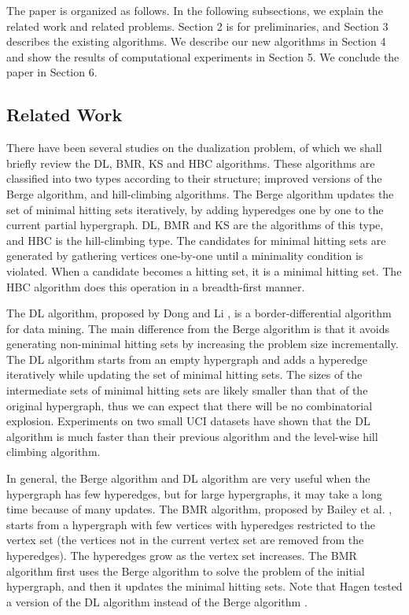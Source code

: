 The paper is organized as follows.
In the following subsections, we explain the related work and related problems.
Section 2 is for preliminaries, and Section 3 describes the existing
 algorithms.
We describe our new algorithms in Section 4 and show the results of
 computational experiments in Section 5.
We conclude the paper in Section 6.

\subsection{Related Work}

There have been several studies on the dualization problem, 
 of which we shall briefly review the DL, BMR, KS and HBC algorithms.
These algorithms are classified into two types according to their structure;
 improved versions of the Berge algorithm\cite{Ber89}, and hill-climbing
 algorithms.
The Berge algorithm updates the set of minimal hitting sets iteratively, 
 by adding hyperedges one by one to the current partial hypergraph.
DL, BMR and KS are the algorithms of this type, and HBC is the hill-climbing
 type.
The candidates for minimal hitting sets are generated by gathering
 vertices one-by-one until a minimality condition is violated.
When a candidate becomes a hitting set, it is a minimal hitting set.
The HBC algorithm does this operation in a breadth-first manner.
 
The DL algorithm, proposed by Dong and Li \cite{DgLj05},
 is a border-differential algorithm for data mining.
The main difference from the Berge algorithm is that it avoids generating
 non-minimal hitting sets by increasing the problem size incrementally.
The DL algorithm starts from an empty hypergraph and adds a hyperedge
 iteratively while updating the set of minimal hitting sets.
The sizes of the intermediate sets of minimal hitting sets are likely
 smaller than that of the original hypergraph, thus we can expect that
 there will be no combinatorial explosion.
Experiments on two small UCI datasets \cite{UCI} have shown that the
 DL algorithm is much faster than their previous algorithm and the
 level-wise hill climbing algorithm.

In general, the Berge algorithm and DL algorithm are very useful
 when the hypergraph has few hyperedges, but for large hypergraphs,
 it may take a long time because of many updates.
The BMR algorithm, proposed by Bailey et al. \cite{BMR03}, starts from
 a hypergraph with few vertices with hyperedges restricted to the vertex set
 (the vertices not in the current vertex set are removed from the hyperedges).
The hyperedges grow as the vertex set increases.
The BMR algorithm first uses the Berge algorithm to solve the problem of
 the initial hypergraph, and then it updates the minimal hitting sets.
Note that Hagen tested a version of the DL algorithm instead of the
 Berge algorithm \cite{Hag08}.

